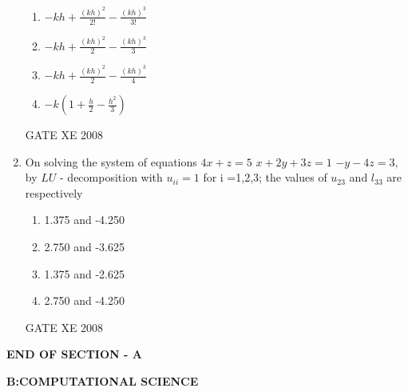\documentclass[12pt]{article}
\begin{document}
\begin{enumerate}
\begin{enumerate}
\item  $-kh + \frac{(kh)^2}{2!} -\frac{(kh)^3}{3!}$
\item   $-kh + \frac{(kh)^2}{2} -\frac{(kh)^3}{3}$
\item   $-kh + \frac{(kh)^2}{2} -\frac{(kh)^3}{4}$
\item   $-k(1+\frac{h}{2}-\frac{h^2}{3})$
\end{enumerate}

GATE XE 2008
\item  On solving the system of equations\newline
$4x+z =5$\newline
$x+2y+3z =1$\newline
$-y-4z=3,$\newline
by $LU$ - decomposition with $u_{ii} =1$ for i =1,2,3; the values of $u_{23}$ and $l_{33}$ are respectively

\begin{enumerate}
\item  1.375 and -4.250
\item  2.750 and -3.625
\item  1.375 and -2.625
\item 2.750 and -4.250
\end{enumerate}

GATE XE 2008\


\end{enumerate}
    
 

\begin{center}
   
    \textbf{END OF SECTION - A}
\end{center}
\newpage
\begin{center}
    \textbf{B:COMPUTATIONAL SCIENCE}
\end{center}
\end{document}
